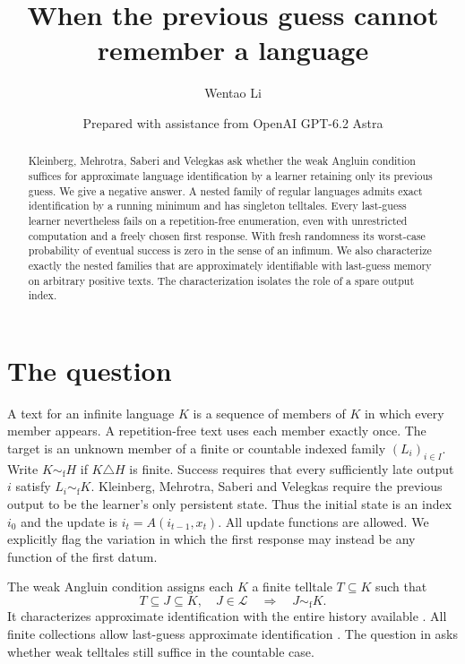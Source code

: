 \documentclass[11pt]{article}
\title{When the previous guess cannot remember a language}
\author{Wentao Li}
\date{\small Prepared with assistance from OpenAI GPT-6.2 Astra}
\newcommand{\simf}{\mathrel{\sim_{\mathrm f}}}
\begin{document}
\maketitle
\begin{abstract}
Kleinberg, Mehrotra, Saberi and Velegkas ask whether the weak Angluin condition suffices for approximate language identification by a learner retaining only its previous guess. We give a negative answer. A nested family of regular languages admits exact identification by a running minimum and has singleton telltales. Every last-guess learner nevertheless fails on a repetition-free enumeration, even with unrestricted computation and a freely chosen first response. With fresh randomness its worst-case probability of eventual success is zero in the sense of an infimum. We also characterize exactly the nested families that are approximately identifiable with last-guess memory on arbitrary positive texts. The characterization isolates the role of a spare output index.
\end{abstract}

\section{The question}
A text for an infinite language $K$ is a sequence of members of $K$ in which every member appears. A repetition-free text uses each member exactly once. The target is an unknown member of a finite or countable indexed family $(L_i)_{i\in I}$. Write $K\simf H$ if $K\triangle H$ is finite. Success requires that every sufficiently late output $i$ satisfy $L_i\simf K$. Kleinberg, Mehrotra, Saberi and Velegkas \cite[Definitions 13--15]{bounded} require the previous output to be the learner's only persistent state. Thus the initial state is an index $i_0$ and the update is $i_t=A(i_{t-1},x_t)$. All update functions are allowed. We explicitly flag the variation in which the first response may instead be any function of the first datum.

The weak Angluin condition assigns each $K$ a finite telltale $T\subseteq K$ such that
\[
    T\subseteq J\subseteq K,\quad J\in\mathcal L
    \quad\Longrightarrow\quad J\simf K .
\]
It characterizes approximate identification with the entire history available \cite{facets,stability,bounded}. All finite collections allow last-guess approximate identification \cite[Theorem 5.2]{bounded}. The question in \cite[Section 1.3]{bounded} asks whether weak telltales still suffice in the countable case.
\end{document}

